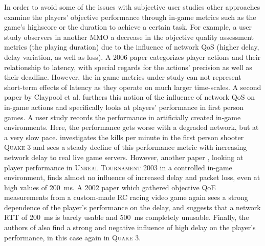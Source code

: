 In order to avoid some of the issues with subjective user studies other 
approaches examine the players' objective performance through in-game 
metrics such as the game's highscore or the duration to achieve a 
certain task. For example, a user study 
\cite{Chen:2006:SOG:1167838.1167859} observers in another \gls{MMO} a 
decrease in the objective quality assessment metrics (the playing 
duration) due to the influence of network \gls{QoS} (higher delay, 
delay variation, as well as loss). A 2006 paper 
\cite{Claypool:2006:LPA:1167838.1167860} categorizes player actions and 
their relationship to latency, with special regards for the actions' 
precision as well as their deadline. However, the in-game metrics under 
study can not represent short-term effects of latency as they operate 
on much larger time-scales. 
A second paper by Claypool et al. \cite{claypool2007} furthers this 
notion of the influence of network \gls{QoS} on in-game actions and 
specifically looks at players' performance in first person games. A 
user study records the performance in artificially created in-game 
environments. Here, the performance gets worse with a degraded network, 
but at a very slow pace. %
\cite{1266180} investigates the kills per minute in the first person 
shooter \textsc{Quake 3} and sees a steady decline of this performance 
metric with increasing network delay to real live game servers. 
However, another paper \cite{Beigbeder:2004:ELL:1016540.1016556}, 
looking at player performance in \textsc{Unreal Tournament 2003} in a 
controlled in-game environment, finds almost no influence of increased 
delay and packet loss, even at high values of \SI{200}{\milli\second}. 
A 2002 paper \cite{Pantel:2002:IDR:507670.507674} which gathered 
objective \gls{QoE} measurements from a custom-made RC racing video 
game again sees a strong dependence of the player's performance on the 
delay, and suggests that a network \acrshort{RTT} of 
\SI{200}{\milli\second} is barely usable and \SI{500}{\milli\second} 
completely unusable. Finally, the authors of 
\cite{Bredel:2010:MSR:1944796.1944797} also find a strong and negative 
influence of high delay on the player's performance, in this case again 
in \textsc{Quake 3}. 

